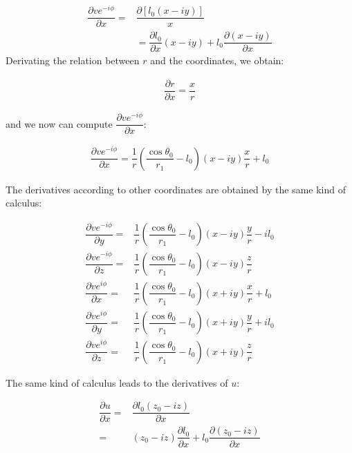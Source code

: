 \documentclass[12pt]{article}
\begin{document}
\begin{eqnarray}
\dfrac{\partial v e^{-i\phi}}{\partial x} =&\dfrac{\partial \left[ l_0\left(x-iy\right)\right]}{x} \nonumber \\
&=\dfrac{\partial l_0}{\partial x}\left(x-iy\right)+l_0\dfrac{\partial\left(x-iy\right)}{\partial x}
\end{eqnarray}
Derivating the relation between $r$ and the coordinates, we obtain:

\begin{eqnarray}
\dfrac{\partial r}{\partial x}=\dfrac{x}{r}
\end{eqnarray}

and we now can compute $\dfrac{\partial v e^{-i\phi}}{\partial x}$:

\begin{eqnarray}
\dfrac{\partial v e^{-i\phi}}{\partial x}=\dfrac{1}{r}\left(\dfrac{\cos \theta_0}{r_1}-l_0\right)\left(x-iy\right) \dfrac{x}{r}+l_0
\end{eqnarray}

The derivatives according to other coordinates are obtained by the same kind of calculus:

\begin{eqnarray} \label{eqn:dv}
\dfrac{\partial v e^{-i\phi}}{\partial y}=&\dfrac{1}{r}\left(\dfrac{\cos \theta_0}{r_1}-l_0\right)\left(x-i y\right)\dfrac{y}{r}-i l_0  \nonumber \\
\dfrac{\partial v e^{-i\phi}}{\partial z}=&\dfrac{1}{r}\left(\dfrac{\cos \theta_0}{r_1}-l_0\right)\left(x-i y\right)\dfrac{z}{r}         \nonumber \\
\dfrac{\partial v e^{i\phi}}{\partial x} =&\dfrac{1}{r}\left(\dfrac{\cos \theta_0}{r_1}-l_0\right)\left(x+i y\right)\dfrac{x}{r}+l_0              \\
\dfrac{\partial v e^{i\phi}}{\partial y} =&\dfrac{1}{r}\left(\dfrac{\cos \theta_0}{r_1}-l_0\right)\left(x+i y\right)\dfrac{y}{r}+i l_0  \nonumber \\
\dfrac{\partial v e^{i\phi}}{\partial z} =&\dfrac{1}{r}\left(\dfrac{\cos \theta_0}{r_1}-l_0\right)\left(x+i y\right)\dfrac{z}{r}         \nonumber 
\end{eqnarray}

The same kind of calculus leads to the derivatives of $u$: 

\begin{eqnarray}
\dfrac{\partial u}{\partial x}=&\dfrac{\partial l_0\left(z_0-iz\right)}{\partial x}  \nonumber \\
=& \left(z_0-iz\right) \dfrac{\partial l_0}{\partial x} + l_0 \dfrac{\partial \left(z_0-iz\right)}{\partial x} 
\end{eqnarray}
\end{document}
